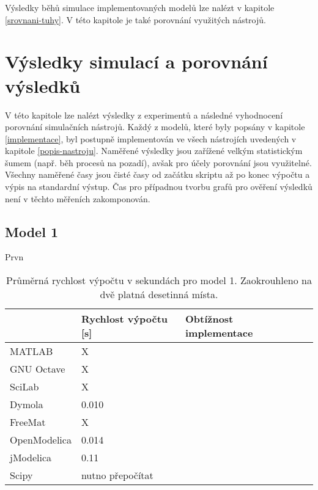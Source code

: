 Výsledky běhů simulace implementovaných modelů lze nalézt v kapitole \ref{srovnani-tuhy}. V této kapitole je také porovnání využitých nástrojů.

\chapter{Výsledky simulací a porovnání výsledků}
\label{kapitola5}
V této kapitole lze nalézt výsledky z experimentů a následné vyhodnocení porovnání simulačních nástrojů. Každý z modelů, které byly popsány v kapitole \ref{implementace}, byl postupně implementován ve všech nástrojích uvedených v kapitole \ref{popis-nastroju}. Naměřené výsledky jsou zařížené velkým statistickým šumem (např. běh procesů na pozadí), avšak pro účely porovnání jsou využitelné. Všechny naměřené časy jsou čisté časy od začátku skriptu až po konec výpočtu a výpis na standardní výstup. Čas pro případnou tvorbu grafů pro ověření výsledků není v těchto měřeních zakomponován.

\section{Model 1}
\label{srovnani-micek}
Prvn


\begin{table}[ht]
\centering
\begin{tabular}{|l|l|l|l|}
\hline
             & Rychlost výpočtu {[}s{]} & Obtížnost implementace &  \\ \hline
MATLAB       &              X            &  &  \\ \hline
GNU Octave   &             X             &  &  \\ \hline
SciLab       &            X              &  &  \\ \hline
Dymola       &         0.010                 &  &  \\ \hline
FreeMat &                X          &  &  \\ \hline
OpenModelica    &       0.014                   &  &  \\ \hline
jModelica        &     0.11                     &  &  \\ \hline
Scipy           &          nutno přepočítat                &  &  \\ \hline
\end{tabular}
\caption{Průměrná rychlost výpočtu v sekundách pro model 1. Zaokrouhleno na dvě platná desetinná místa.}
\label{tab:micek-tabulka}
\end{table}

